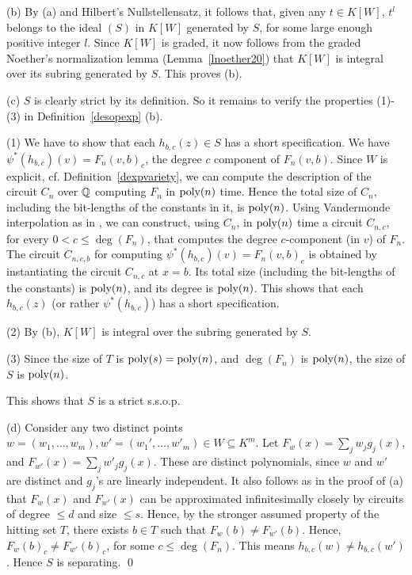 \documentclass[11pt]{article}
\begin{document}
\noindent (b) By (a) and Hilbert's Nullstellensatz, 
it follows that, given any  $t\in K[W]$, $t^l$ belongs to the ideal $(S)$
in $K[W]$ generated by $S$, for some large enough positive integer $l$. 
Since $K[W]$ is graded, it now follows from the  graded Noether's normalization lemma
(Lemma~\ref{lnoether20}) that $K[W]$ is integral over its subring generated by $S$. This proves (b).

\noindent (c) $S$ is clearly strict by its definition. 
So it remains to verify the properties (1)-(3) in Definition~\ref{desopexp} (b).

\noindent (1)  We have to show that each $h_{b,c}(z) \in S$ has a short specification.
We have $\psi^*(h_{b,c})(v)=F_n(v,b)_c$, the degree $c$ component of $F_n(v,b)$. 
Since $W$ is explicit, cf.  Definition~\ref{dexpvariety}, we 
can compute the description of the circuit $C_n$ over $\mathbb{Q}$ computing $F_n$ in ${\mbox {poly}}(n)$ time. Hence the total size of $C_n$,
including the bit-lengths of the constants in it, is ${\mbox {poly}}(n)$. 
Using Vandermonde interpolation as in \cite{strassen,yehu}, we can construct, using $C_n$, in ${\mbox {poly}}(n)$ time
a circuit $C_{n,c}$, for every $0 < c \le \deg(F_n)$, that  computes the degree $c$-component (in $v$) of $F_n$.
The circuit $C_{n,c,b}$ for computing $\psi^*(h_{b,c})(v)=F_n(v,b)_c$  is obtained by instantiating the circuit $C_{n,c}$
at $x=b$. Its total size (including the bit-lengths of the constants) is ${\mbox {poly}}(n)$, and its degree is ${\mbox {poly}}(n)$.
This shows that each $h_{b,c}(z)$ (or rather $\psi^*(h_{b,c})$) has a short specification.

\noindent (2) By (b), $K[W]$ is integral over the subring generated by $S$.

\noindent (3) Since the size of $T$ is ${\mbox {poly}}(s)={\mbox {poly}}(n)$, and $\deg(F_n)$ is ${\mbox {poly}}(n)$, the size of $S$ is  ${\mbox {poly}}(n)$.

This shows that $S$ is a strict  s.s.o.p.  

\noindent (d) 
Consider any two distinct  points $w=(w_1,\ldots,w_m), w'=(w_1',\ldots,w'_m) \in W \subseteq K^m$.
Let $F_w(x)=\sum_j w_j g_j(x)$, and  $F_{w'}(x)=\sum_j w'_j g_j(x)$. 
These are distinct polynomials, since $w$ and $w'$ are distinct and $g_j$'s are linearly 
independent.
It also follows as in the proof of (a) that $F_w(x)$ and $F_{w'}(x)$ can be 
approximated infinitesimally closely 
by circuits of  degree $\le d$ and size $\le s$. Hence, by the stronger assumed property of the
hitting set $T$,  there exists $b \in T$ such that $F_w(b) \not = F_{w'}(b)$. 
Hence, $F_w(b)_c \not = F_{w'}(b)_c$, for some $c \le \deg(F_n)$. This means
$h_{b,c}(w) \not = h_{b,c}(w')$. Hence $S$ is separating.
\qed 
\end{document}
